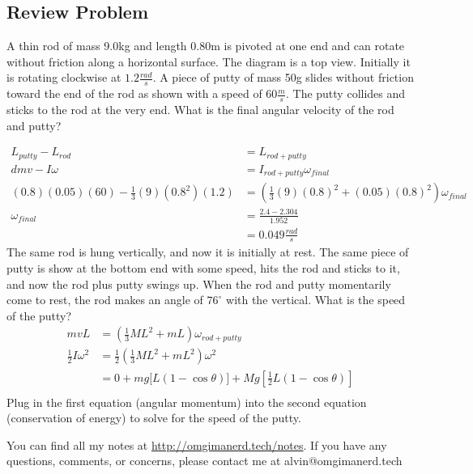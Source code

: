 \documentclass{math}
\begin{document}
\subsection*{Review Problem}
A thin rod of mass 9.0kg and length 0.80m is pivoted at one end and can
rotate without friction along a horizontal surface. The diagram is a top view.
Initially it is rotating clockwise at \( 1.2\frac{rad}{s} \). A piece of putty
of mass 50g slides without friction toward the end of the rod as shown with
a speed of \( 60\frac{m}{s} \). The putty collides and sticks to the rod at
the very end. What is the final angular velocity of the rod and putty?
\begin{center}
\end{center}
\begin{align*}
  L_{putty}-L_{rod} &= L_{rod+putty} \\
  dmv-I\omega &= I_{rod+putty}\omega_{final} \\
  (0.8)(0.05)(60)-\frac{1}{3}(9)(0.8^2)(1.2) &=
    (\frac{1}{3}(9)(0.8)^2+(0.05)(0.8)^2)\omega_{final} \\
  \omega_{final} &= \frac{2.4-2.304}{1.952} \\
  &= 0.049\frac{rad}{s}
\end{align*}
The same rod is hung vertically, and now it is initially at rest. The same
piece of putty is show at the bottom end with some speed, hits the rod and
sticks to it, and now the rod plus putty swings up. When the rod and putty
momentarily come to rest, the rod makes an angle of \( 76^{\circ} \) with the
vertical. What is the speed of the putty?
\begin{align*}
  mvL &= \left(\frac{1}{3}ML^2+mL\right)\omega_{rod+putty} \\
  \frac{1}{2}I\omega^2 &=
    \frac{1}{2}\left(\frac{1}{3}ML^2+mL^2\right)\omega^2 \\
  &= 0+mg\bigg[L(1-\cos\theta)\bigg]+
    Mg\left[\frac{1}{2}L(1-\cos\theta)\right] \\
\end{align*}
Plug in the first equation (angular momentum) into the second equation
(conservation of energy) to solve for the speed of the putty.

\begin{center}
  You can find all my notes at \url{http://omgimanerd.tech/notes}. If you have
  any questions, comments, or concerns, please contact me at
  alvin@omgimanerd.tech
\end{center}
\end{document}
